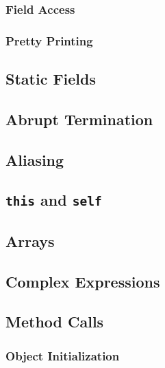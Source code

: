 \documentclass[a4paper, 11pt, accentcolor = tud3b]{tudreport}
\begin{document}
				\subsubsection{Field Access} %

				\subsubsection{Pretty Printing} %

			\subsection{Static Fields} %

			\subsection{Abrupt Termination} %

			\subsection{Aliasing} %

			\subsection{\texttt{this} and \texttt{self}} %

			\subsection{Arrays} %

			\subsection{Complex Expressions} %

			\subsection{Method Calls} %

				\subsubsection{Object Initialization} %
\end{document}
